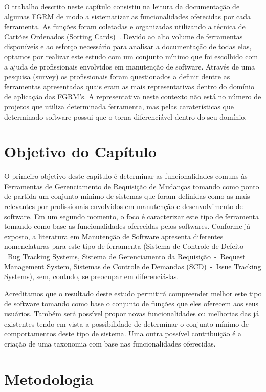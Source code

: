 O trabalho descrito neste capítulo consistiu na leitura da documentação de
algumas FGRM de modo a sistematizar as funcionalidades oferecidas por cada
ferramenta.  As funções foram coletadas e organizadas utilizando a técnica de
Cartões Ordenados (Sorting Cards)~\cite{5070993, rugg2005sorting}. Devido ao
alto volume de ferramentas disponíveis e ao esforço necessário para analisar a
documentação de todas elas, optamos por realizar este estudo com um conjunto
mínimo que foi escolhido com a ajuda de profissionais envolvidos em manutenção
de software. Através de uma pesquisa (survey) os profissionais foram
questionados a definir dentre as ferramentas apresentadas quais eram as mais
representativas dentro do domínio de aplicação das FGRM's. A representativa
neste contexto não está no número de projetos que utiliza determinada
ferramenta, mas pelas caraterísticas que determinado software possui que o torna
diferenciável dentro do seu domínio.

\section{Objetivo do Capítulo}
\label{sec:objetivo_do_capítulo}

O primeiro objetivo deste capítulo é determinar as funcionalidades comuns às
Ferramentas de Gerenciamento de Requisição de Mudanças tomando como ponto de
partida um conjunto mínimo de sistemas que foram definidas como as mais
relevantes por profissionais envolvidos em manutenção e desenvolvimento de
software. Em um segundo momento, o foco é caracterizar este tipo de ferramenta
tomando como base as funcionalidades oferecidas pelos softwares. Conforme já
exposto, a literatura em Manutenção de Software apresenta diferentes
nomenclaturas para este tipo de ferramenta (Sistema de Controle de Defeito~-~Bug
Tracking Systems, Sistema de Gerenciamento da Requisição~-~Request Management
System, Sistemas de Controle de Demandas (SCD)~-~Issue Tracking Systems), sem,
contudo, se preocupar em diferenciá-las.

Acreditamos que o resultado deste estudo permitirá compreender melhor este tipo
de software tomando como base o conjunto de funções que eles oferecem aos seus
usuários. Também será possível propor novas funcionalidades ou melhorias das já
existentes tendo em vista a possibilidade de determinar o conjunto mínimo de
comportamentos deste tipo de sistema. Uma outra possível contribuição é a
criação de uma taxonomia com base nas funcionalidades oferecidas.

\section{Metodologia}
\label{sec:metodologia}

